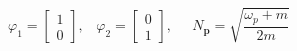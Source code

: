 \begin{equation}
\varphi _{1}=\left[ 
\begin{array}{c}
1 \\ 
0
\end{array}
\right] ,\;\;\;\varphi _{2}=\left[ 
\begin{array}{c}
0 \\ 
1
\end{array}
\right] ,\;\;\;\;\;N_{\mathbf{p}}=\sqrt{\frac{\omega _{p}+m}{2m}}
\end{equation}

